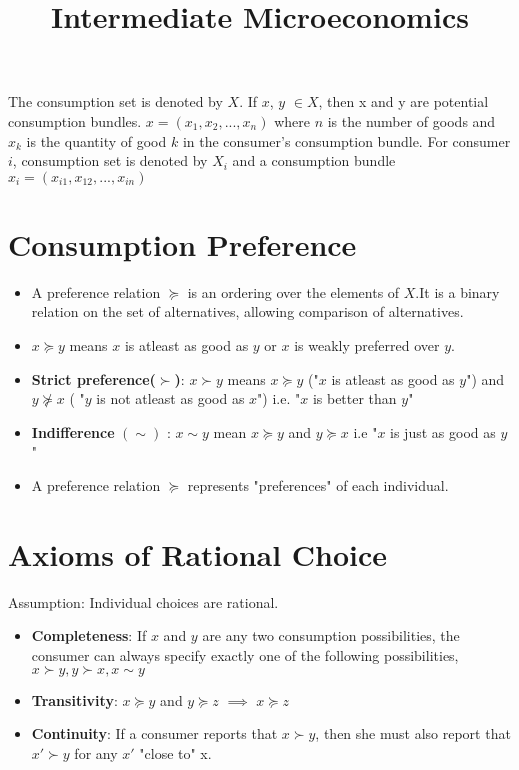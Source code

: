\documentclass{tufte-handout}
\title{Intermediate Microeconomics}
\begin{document}
	

The consumption set is denoted by $X$.
If $x$, $y$ $\in X$, then x and y are potential consumption bundles.
$x =(x_1, x_2,...,x_n)$ where $n$ is the number of goods and $x_k$ is the quantity of good $k$ in the consumer's consumption bundle. For consumer $i$, consumption set is denoted by $X_i$ and a consumption bundle $x_i = (x_{i1}, x_{12},..., x_{in})$


\section*{Consumption Preference}



\begin{itemize}

		\item 	A preference relation $\succeq$ is an ordering over the elements of  $X$.It is a binary relation on the set of alternatives, allowing comparison of alternatives.
	\item  $x \succeq y$ means  $x$ is atleast as good as  $y$ or $ x$ is weakly preferred over  $y$. 
	\item \textbf{ Strict preference($\succ$)}:  $x \succ y$ means  $x \succeq y$ ("$x$ is atleast as good as  $y$") and $y \not \succeq x$ ( "$y$ is not atleast as good as  $x$") i.e. "$x$ is better than $y$"
	
	\item \textbf{Indifference} $(\sim)$ : $x \sim y$ mean $x \succeq y$ and  $y \succeq x$ i.e "$x$ is just as good as $y$" 
	\item A preference relation $\succeq$ represents "preferences" of each individual.

		
\end{itemize}

\section*{Axioms of Rational Choice}
Assumption: Individual choices are rational.

\begin{itemize}
		 \item \textbf{Completeness}: If $x$ and  $y$ are any two consumption possibilities, the consumer can always specify exactly one of the following possibilities, $ x \succ y, y \succ x, x \sim y $
		\item \textbf{ Transitivity}: $x \succeq y$ and  $ y \succeq z$  $\implies$  $ x \succeq z$ 
		\item \textbf{Continuity}: If a consumer reports that $x \succ y$, then she must also report that  $x' \succ y$ for any  $x'$ "close to" x.
\end{itemize}	
\end{document}
